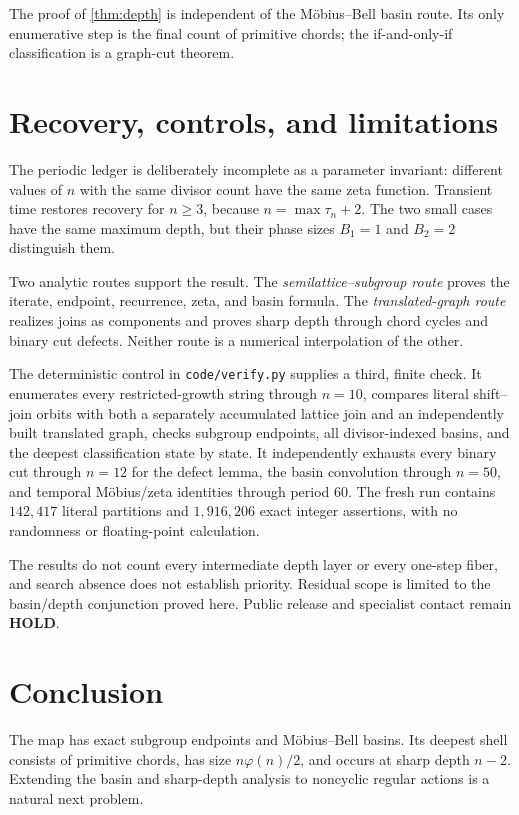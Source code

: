 \documentclass[11pt,a4paper]{amsart}
\theoremstyle{definition}
\theoremstyle{remark}
\begin{document}
The proof of \cref{thm:depth} is independent of the M\"obius--Bell basin
route.  Its only enumerative step is the final count of primitive chords;
the if-and-only-if classification is a graph-cut theorem.

\section{Recovery, controls, and limitations}\label{sec:control}

The periodic ledger is deliberately incomplete as a parameter invariant:
different values of $n$ with the same divisor count have the same zeta
function.  Transient time restores recovery for $n\geq3$, because
$n=\max\tau_n+2$.  The two small cases have the same maximum depth, but
their phase sizes $B_1=1$ and $B_2=2$ distinguish them.

Two analytic routes support the result.  The \emph{semilattice--subgroup
route} proves the iterate, endpoint, recurrence, zeta, and basin formula.
The \emph{translated-graph route} realizes joins as components and proves
sharp depth through chord cycles and binary cut defects.  Neither route is
a numerical interpolation of the other.

The deterministic control in \texttt{code/verify.py} supplies a third,
finite check.  It enumerates every restricted-growth string through
$n=10$, compares literal shift--join orbits with both a separately
accumulated lattice join and an independently built translated graph,
checks subgroup endpoints, all divisor-indexed basins, and the deepest
classification state by state.  It independently exhausts every binary cut
through $n=12$ for the defect lemma, the basin convolution through $n=50$,
and temporal M\"obius/zeta identities through period $60$.  The fresh run
contains $142{,}417$ literal partitions and $1{,}916{,}206$ exact integer
assertions, with no randomness or floating-point calculation.

The results do not count every intermediate depth layer or every one-step
fiber, and search absence does not establish priority.  Residual scope is
limited to the basin/depth conjunction proved here.  Public release and
specialist contact remain \textbf{HOLD}.

\section{Conclusion}

The map has exact subgroup endpoints and M\"obius--Bell basins.  Its deepest
shell consists of primitive chords, has size $n\varphi(n)/2$, and occurs at
sharp depth $n-2$.  Extending the basin and sharp-depth analysis to noncyclic
regular actions is a natural next problem.

\begingroup
\footnotesize


\endgroup
\end{document}
